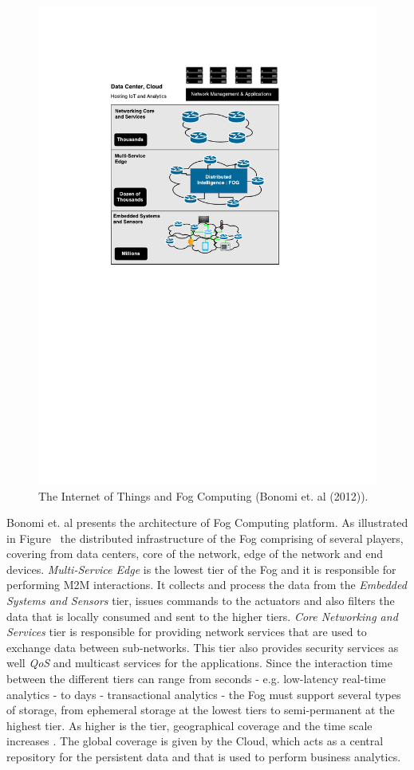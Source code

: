 \begin{figure}[ht!]
  \centering
  \includegraphics[width=.5\textwidth]{./figures/fog_architecture}
  \caption[IoT and Fog Computing.]{The Internet of Things and Fog Computing (Bonomi et. al (2012)).}
  \label{fig:fog_architecture}
\end{figure}

Bonomi et. al \cite{bonomi2012fog} presents the architecture of Fog Computing platform. As illustrated
in Figure~\cite{bonomi2012fog} the distributed infrastructure of the Fog comprising of several players,
covering from data centers, core of the network, edge of the network and end devices.
\textit{Multi-Service Edge} is the lowest tier of the Fog and it is responsible for
performing \gls{M2M} interactions. It collects and process the data from the \textit{Embedded Systems and Sensors}
tier, issues commands to the actuators and also filters the data that is locally
consumed and sent to the higher tiers. \textit{Core Networking and Services} tier is
responsible for providing network services that are used to exchange data between
sub-networks. This tier also provides security services as well \textit{QoS} and multicast
services for the applications. Since the interaction time between the different tiers
can range from seconds - e.g. low-latency real-time analytics - to days - transactional
analytics - the Fog must support several types of storage, from ephemeral storage at the
lowest tiers to semi-permanent at the highest tier. As higher is the tier, geographical coverage and
the time scale increases \cite{bonomi2014fog}. The global coverage is given by the Cloud, which
acts as a central repository for the persistent data and that is used to perform business analytics.

